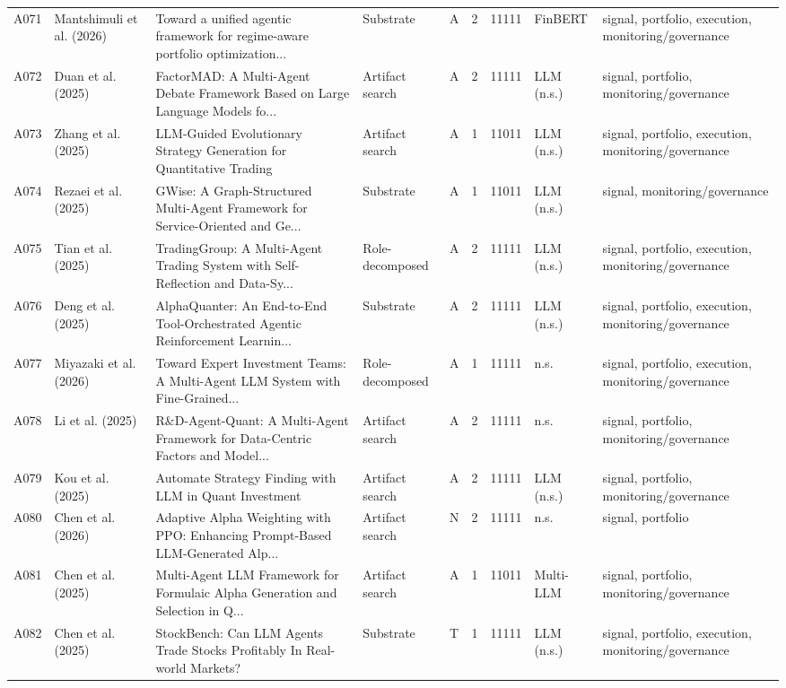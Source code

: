 \begin{longtable}{p{0.7cm} p{1.9cm} p{3.85cm} p{1.7cm} p{0.65cm} p{0.55cm} p{1.2cm} p{1.8cm} p{2.0cm}}
A071 & Mantshimuli et al. (2026) & Toward a unified agentic framework for regime-aware portfolio optimization... & Substrate & A & 2 & 11111 & FinBERT & signal, portfolio, execution, monitoring/governance \\
A072 & Duan et al. (2025) & FactorMAD: A Multi-Agent Debate Framework Based on Large Language Models fo... & Artifact search & A & 2 & 11111 & LLM (n.s.) & signal, portfolio, monitoring/governance \\
A073 & Zhang et al. (2025) & LLM-Guided Evolutionary Strategy Generation for Quantitative Trading & Artifact search & A & 1 & 11011 & LLM (n.s.) & signal, portfolio, execution, monitoring/governance \\
A074 & Rezaei et al. (2025) & GWise: A Graph-Structured Multi-Agent Framework for Service-Oriented and Ge... & Substrate & A & 1 & 11011 & LLM (n.s.) & signal, monitoring/governance \\
A075 & Tian et al. (2025) & TradingGroup: A Multi-Agent Trading System with Self-Reflection and Data-Sy... & Role-decomposed & A & 2 & 11111 & LLM (n.s.) & signal, portfolio, execution, monitoring/governance \\
A076 & Deng et al. (2025) & AlphaQuanter: An End-to-End Tool-Orchestrated Agentic Reinforcement Learnin... & Substrate & A & 2 & 11111 & LLM (n.s.) & signal, portfolio, execution, monitoring/governance \\
A077 & Miyazaki et al. (2026) & Toward Expert Investment Teams: A Multi-Agent LLM System with Fine-Grained... & Role-decomposed & A & 1 & 11111 & n.s. & signal, portfolio, execution, monitoring/governance \\
A078 & Li et al. (2025) & R\&D-Agent-Quant: A Multi-Agent Framework for Data-Centric Factors and Model... & Artifact search & A & 2 & 11111 & n.s. & signal, portfolio, monitoring/governance \\
A079 & Kou et al. (2025) & Automate Strategy Finding with LLM in Quant Investment & Artifact search & A & 2 & 11111 & LLM (n.s.) & signal, portfolio, monitoring/governance \\
A080 & Chen et al. (2026) & Adaptive Alpha Weighting with PPO: Enhancing Prompt-Based LLM-Generated Alp... & Artifact search & N & 2 & 11111 & n.s. & signal, portfolio \\
A081 & Chen et al. (2025) & Multi-Agent LLM Framework for Formulaic Alpha Generation and Selection in Q... & Artifact search & A & 1 & 11011 & Multi-LLM & signal, portfolio, monitoring/governance \\
A082 & Chen et al. (2025) & StockBench: Can LLM Agents Trade Stocks Profitably In Real-world Markets? & Substrate & T & 1 & 11111 & LLM (n.s.) & signal, portfolio, execution, monitoring/governance \\
\end{longtable}
\endgroup
